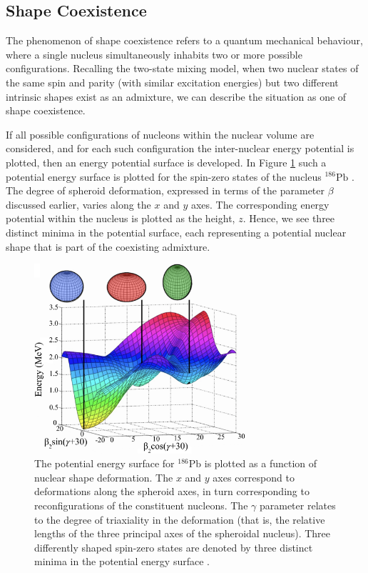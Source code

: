 \subsection{Shape Coexistence}

The phenomenon of shape coexistence refers to a quantum mechanical behaviour, where a single nucleus simultaneously inhabits two or more possible configurations. Recalling the two-state mixing model, when two nuclear states of the same spin and parity (with similar excitation energies) but two different intrinsic shapes exist as an admixture, we can describe the situation as one of shape coexistence. 

If all possible configurations of nucleons within the nuclear volume are considered, and for each such configuration the inter-nuclear energy potential is plotted, then an energy potential surface is developed. In Figure \ref{figure: famous Pb figure} such a potential energy surface is plotted for the spin-zero states of the nucleus $^{186}\mathrm{Pb}$ \cite{Duguet2003}. The degree of spheroid deformation, expressed in terms of the parameter $\beta$ discussed earlier, varies along the $x$ and $y$ axes. The corresponding energy potential within the nucleus is plotted as the height, $z$. Hence, we see three distinct minima in the potential surface, each representing a potential nuclear shape that is part of the coexisting admixture. 

\begin{figure}[!ht]
  \centering
  \includegraphics[width=0.7\textwidth]{theory_Pb_shape.png}
  \caption[The potential energy surface for $^{186}\mathrm{Pb}$ is plotted as a function of nuclear shape deformation. Three distinct minima, corresponding to three distinct nuclear structures, are highlighted.]{The potential energy surface for $^{186}\mathrm{Pb}$ is plotted as a function of nuclear shape deformation. The $x$ and $y$ axes correspond to deformations along the spheroid axes, in turn corresponding to reconfigurations of the constituent nucleons. The $\gamma$ parameter relates to the degree of triaxiality in the deformation (that is, the relative lengths of the three principal axes of the spheroidal nucleus). Three differently shaped spin-zero states are denoted by three distinct minima in the potential energy surface \cite{Duguet2003}.}
  \label{figure: famous Pb figure}
\end{figure}

